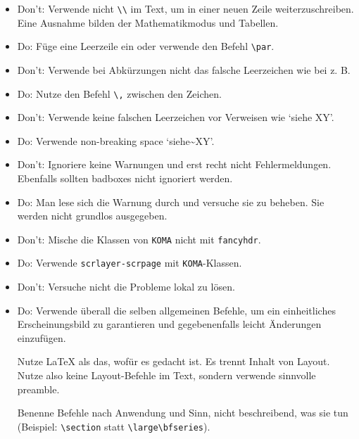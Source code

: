 \documentclass[11pt,
               a4paper,
               parskip=half,
               ]{scrartcl}
\newcommand{\textsw}[1]{\texttt{#1}} %
\begin{document}
\begin{itemize}
  \item Don't: Verwende nicht \verb+\\+ im Text,
    um in einer neuen Zeile weiterzuschreiben.
    Eine Ausnahme bilden der Mathematikmodus und Tabellen.
  \item Do: Füge eine Leerzeile ein oder verwende den Befehl \verb+\par+.
\end{itemize}

\begin{itemize}
  \item Don't: Verwende bei Abkürzungen nicht das falsche Leerzeichen wie bei z. B.
  \item Do: Nutze den Befehl \verb+\,+ zwischen den Zeichen.
\end{itemize}

\begin{itemize}
  \item Don't: Verwende keine falschen Leerzeichen vor Verweisen wie \enquote*{siehe XY}.
  \item Do: Verwende non-breaking space \enquote*{siehe\textasciitilde XY}.
\end{itemize}

\begin{itemize}
  \item Don't: Ignoriere keine Warnungen und erst recht nicht Fehlermeldungen.
    Ebenfalls sollten badboxes nicht ignoriert werden.
  \item Do: Man lese sich die Warnung durch und versuche sie zu beheben.
    Sie werden nicht grundlos ausgegeben.
\end{itemize}

\begin{itemize}
  \item Don't: Mische die Klassen von \textsw{KOMA} nicht mit \textsw{fancyhdr}.
  \item Do: Verwende \textsw{scrlayer-scrpage} mit \textsw{KOMA}-Klassen.
\end{itemize}

\begin{itemize}
  \item Don't: Versuche nicht die Probleme lokal zu lösen.
  \item Do: Verwende überall die selben allgemeinen Befehle,
    um ein einheitliches Erscheinungsbild zu garantieren
    und gegebenenfalls leicht Änderungen einzufügen.

    Nutze \LaTeX{} als das, wofür es gedacht ist.
    Es trennt Inhalt von Layout.
    Nutze also keine Layout-Befehle im Text,
    sondern verwende sinnvolle preamble.

    Benenne Befehle nach Anwendung und Sinn,
    nicht beschreibend, was sie tun (Beispiel: \verb+\section+ statt \verb+\large\bfseries+).
\end{itemize}
\end{document}
